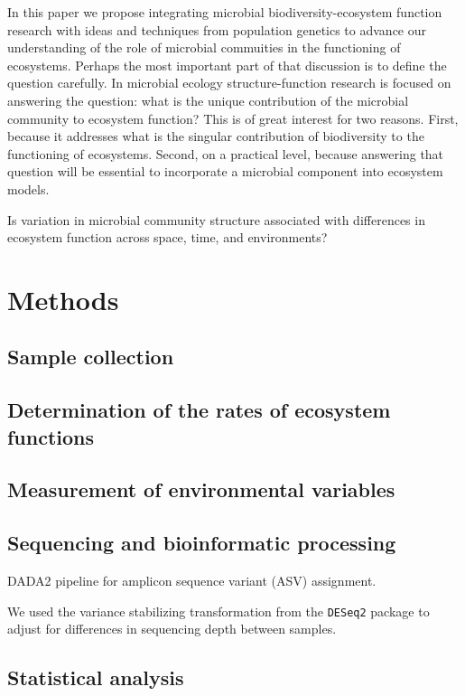 \documentclass{article}
\begin{document}
In this paper we propose integrating microbial biodiversity-ecosystem function
research with ideas and techniques from population genetics to advance our
understanding of the role of microbial commuities in the functioning of
ecosystems. Perhaps the most important part of that discussion is to define the
question carefully. In microbial ecology
structure-function research is focused on answering the question: what is the
unique contribution of the microbial community to ecosystem function? This is of
great interest for two reasons. First, because it addresses what is the singular
contribution of biodiversity to the functioning of ecosystems. Second, on a
practical level, because answering that question will be essential to
incorporate a microbial component into ecosystem models.

Is variation in microbial community
structure associated with differences in ecosystem function across space,
time, and environments?

\section{Methods}

\subsection{Sample collection}

\subsection{Determination of the rates of ecosystem functions}

\subsection{Measurement of environmental variables}

\subsection{Sequencing and bioinformatic processing}

DADA2 pipeline for amplicon sequence variant (ASV) assignment.

We used the variance stabilizing transformation from the \texttt{DESeq2}
package to adjust for differences in sequencing depth between samples. 

\subsection{Statistical analysis}
\end{document}
